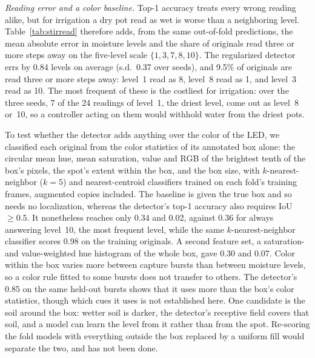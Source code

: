 ﻿\documentclass[journal]{IEEEtran}
\begin{document}
\emph{Reading error and a color baseline.} Top-1 accuracy treats every wrong reading alike, but for irrigation a dry pot read as wet is worse than a neighboring level. Table~\ref{tab:stirread} therefore adds, from the same out-of-fold predictions, the mean absolute error in moisture levels and the share of originals read three or more steps away on the five-level scale $\{1, 3, 7, 8, 10\}$. The regularized detector errs by 0.84 levels on average (s.d.\ 0.37 over seeds), and 9.5\% of originals are read three or more steps away: level~1 read as 8, level~8 read as 1, and level~3 read as 10. The most frequent of these is the costliest for irrigation: over the three seeds, 7 of the 24 readings of level~1, the driest level, come out as level~8 or~10, so a controller acting on them would withhold water from the driest pots.

To test whether the detector adds anything over the color of the LED, we classified each original from the color statistics of its annotated box alone: the circular mean hue, mean saturation, value and RGB of the brightest tenth of the box's pixels, the spot's extent within the box, and the box size, with $k$-nearest-neighbor ($k = 5$) and nearest-centroid classifiers trained on each fold's training frames, augmented copies included. The baseline is given the true box and so needs no localization, whereas the detector's top-1 accuracy also requires IoU~$\geq 0.5$. It nonetheless reaches only 0.34 and 0.02, against 0.36 for always answering level~10, the most frequent level, while the same $k$-nearest-neighbor classifier scores 0.98 on the training originals. A second feature set, a saturation- and value-weighted hue histogram of the whole box, gave 0.30 and 0.07. Color within the box varies more between capture bursts than between moisture levels, so a color rule fitted to some bursts does not transfer to others. The detector's 0.85 on the same held-out bursts shows that it uses more than the box's color statistics, though which cues it uses is not established here. One candidate is the soil around the box: wetter soil is darker, the detector's receptive field covers that soil, and a model can learn the level from it rather than from the spot. Re-scoring the fold models with everything outside the box replaced by a uniform fill would separate the two, and has not been done.
\end{document}
